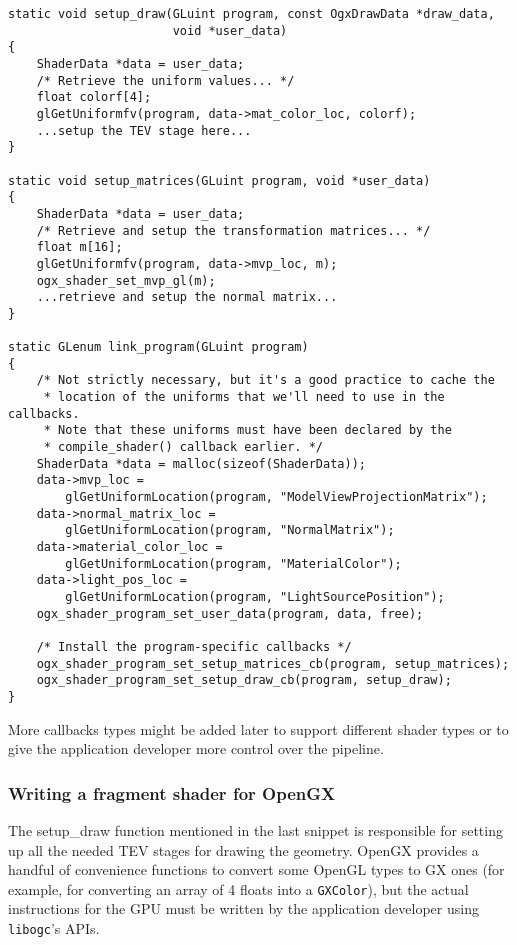 \documentclass[12pt]{article}
\newcommand{\fname}[1] {{\color{blue}#1}}
\begin{document}
\begin{lstlisting}
static void setup_draw(GLuint program, const OgxDrawData *draw_data,
                       void *user_data)
{
    ShaderData *data = user_data;
    /* Retrieve the uniform values... */
    float colorf[4];
    glGetUniformfv(program, data->mat_color_loc, colorf);
    ...setup the TEV stage here...
}

static void setup_matrices(GLuint program, void *user_data)
{
    ShaderData *data = user_data;
    /* Retrieve and setup the transformation matrices... */
    float m[16];
    glGetUniformfv(program, data->mvp_loc, m);
    ogx_shader_set_mvp_gl(m);
    ...retrieve and setup the normal matrix...
}

static GLenum link_program(GLuint program)
{
    /* Not strictly necessary, but it's a good practice to cache the
     * location of the uniforms that we'll need to use in the callbacks.
     * Note that these uniforms must have been declared by the 
     * compile_shader() callback earlier. */
    ShaderData *data = malloc(sizeof(ShaderData));
    data->mvp_loc =
        glGetUniformLocation(program, "ModelViewProjectionMatrix");
    data->normal_matrix_loc =
        glGetUniformLocation(program, "NormalMatrix");
    data->material_color_loc =
        glGetUniformLocation(program, "MaterialColor");
    data->light_pos_loc =
        glGetUniformLocation(program, "LightSourcePosition");
    ogx_shader_program_set_user_data(program, data, free);

    /* Install the program-specific callbacks */
    ogx_shader_program_set_setup_matrices_cb(program, setup_matrices);
    ogx_shader_program_set_setup_draw_cb(program, setup_draw);
}
\end{lstlisting}

More callbacks types might be added later to support different shader types or to give the application developer more control over the pipeline.

\subsubsection{Writing a fragment shader for OpenGX}

The \fname{setup\_draw} function mentioned in the last snippet is responsible for setting up all the needed TEV stages for drawing the geometry. OpenGX provides a handful of convenience functions to convert some OpenGL types to GX ones (for example, for converting an array of 4 floats into a \lstinline{GXColor}), but the actual instructions for the GPU must be written by the application developer using \lstinline{libogc}'s APIs.
\end{document}
